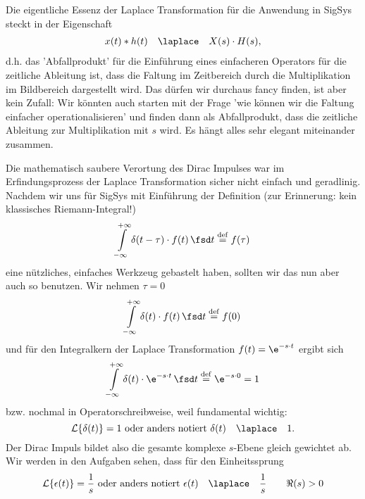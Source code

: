 Die eigentliche Essenz der Laplace Transformation für die Anwendung in
SigSys steckt in der Eigenschaft
\begin{align}
\label{eq:laplace_intro_ast_mult}
x(t) \ast h(t) \quad\laplace\quad X(s) \cdot H(s),
\end{align}
d.h. das 'Abfallprodukt' für die Einführung eines einfacheren Operators
für die zeitliche Ableitung ist, dass die Faltung im Zeitbereich durch die
Multiplikation im Bildbereich dargestellt wird. Das dürfen wir durchaus fancy finden, ist aber
kein Zufall: Wir könnten auch starten mit der Frage 'wie können wir die Faltung
einfacher operationalisieren' und finden dann als Abfallprodukt, dass die
zeitliche Ableitung zur Multiplikation mit $s$ wird. Es hängt alles sehr elegant
miteinander zusammen.

Die mathematisch saubere Verortung des Dirac Impulses war im Erfindungsprozess
der Laplace Transformation sicher nicht einfach und geradlinig.
Nachdem wir uns für SigSys mit Einführung
der Definition (zur Erinnerung: kein klassisches Riemann-Integral!)
\begin{equation}
\int\limits_{-\infty}^{+\infty} \delta(t-\tau) \cdot f(t) \, \fsd t \stackrel{\mathrm{def}}= f(\tau)
\end{equation}
eine nützliches, einfaches Werkzeug gebastelt haben, sollten wir das nun aber auch so
benutzen.
Wir nehmen $\tau=0$
\begin{equation}
\int\limits_{-\infty}^{+\infty} \delta(t) \cdot f(t) \, \fsd t \stackrel{\mathrm{def}}= f(0)
\end{equation}
und für den Integralkern der Laplace Transformation $f(t)=\e^{-s \cdot t}$
ergibt sich
\begin{equation}
\int\limits_{-\infty}^{+\infty} \delta(t) \cdot \e^{-s \cdot t} \, \fsd t \stackrel{\mathrm{def}}= \e^{-s \cdot 0} = 1
\end{equation}
bzw. nochmal in Operatorschreibweise, weil fundamental wichtig:
%
\begin{equation}
  \mathcal{L}\{\delta(t)\} = 1
  \text{ oder anders notiert }
  \delta(t) \quad\laplace\quad 1.
\end{equation}
%
Der Dirac Impuls bildet also die gesamte komplexe $s$-Ebene gleich gewichtet ab.
%
Wir werden in den Aufgaben sehen, dass für den Einheitssprung
\begin{equation}
  \mathcal{L}\{\epsilon(t)\} = \frac{1}{s}
  \text{ oder anders notiert }
  \epsilon(t) \quad\laplace\quad \frac{1}{s} \qquad \Re(s)>0
\end{equation}
